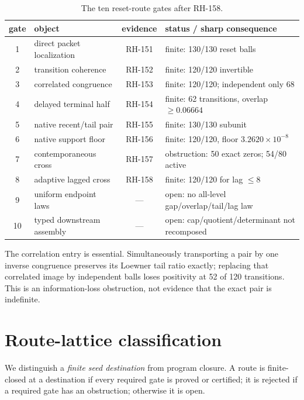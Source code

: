 \documentclass[12pt]{article}
\begin{document}
\begin{table}[t]
\centering
\scriptsize
\renewcommand{\arraystretch}{1.08}
\begin{tabular}{clcl}
\toprule
gate & object & evidence & status / sharp consequence\\
\midrule
1 & direct packet localization & RH-151 & finite: 130/130 reset balls\\
2 & transition coherence & RH-152 & finite: 120/120 invertible\\
3 & correlated congruence & RH-153 & finite: 120/120; independent only 68\\
4 & delayed terminal half & RH-154 & finite: 62 transitions, overlap $\geq0.06664$\\
5 & native recent/tail pair & RH-155 & finite: 130/130 subunit\\
6 & native support floor & RH-156 & finite: 120/120, floor $3.2620\times10^{-8}$\\
7 & contemporaneous cross & RH-157 & obstruction: 50 exact zeros; 54/80 active\\
8 & adaptive lagged cross & RH-158 & finite: 120/120 for lag $\leq8$\\
9 & uniform endpoint laws & --- & open: no all-level gap/overlap/tail/lag law\\
10 & typed downstream assembly & --- & open: cap/quotient/determinant not recomposed\\
\bottomrule
\end{tabular}
\caption{The ten reset-route gates after RH-158.}
\label{tab:gates}
\end{table}

The correlation entry is essential.  Simultaneously transporting a pair by
one inverse congruence preserves its Loewner tail ratio exactly; replacing
that correlated image by independent balls loses positivity at 52 of 120
transitions.  This is an information-loss obstruction, not evidence that the
exact pair is indefinite.

\section{Route-lattice classification}
We distinguish a \emph{finite seed destination} from program closure.  A
route is finite-closed at a destination if every required gate is proved or
certified; it is rejected if a required gate has an obstruction; otherwise it
is open.
\end{document}
